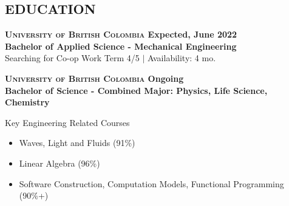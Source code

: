 \documentclass{article}
\begin{document}
\begin{textbox}
    \flushleft
    
    \subsection*{ EDUCATION}
    \hline
    \vspace{1em}
    \textbf{\textsc{University of British Colombia} \hfill \textbf{Expected, June 2022} \\
    Bachelor of Applied Science - Mechanical Engineering} \\
    Searching for Co-op Work Term 4/5 $|$ Availability: 4 mo.
    \vspace{1em}
    
    \textbf{\textsc{University of British Colombia} \hfill \textbf{Ongoing} \\
    Bachelor of Science - Combined Major: Physics, Life Science, Chemistry} \\
    \vspace{0.3em}
    
    Key Engineering Related Courses
    \vspace{-0.5em}
    \begin{itemize}
       \setlength\itemsep{-0.25em}
           \item Waves, Light and Fluids (91\%)
           \item Linear Algebra (96\%)
           \item Software Construction, Computation Models, Functional Programming (90\%+)
       \end{itemize} \\ 
       
       

\end{textbox}
\end{document}
